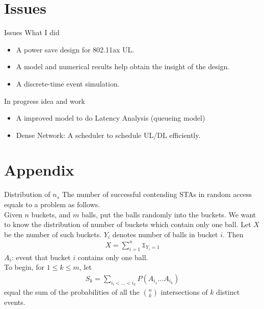 \documentclass[10pt]{beamer}
\begin{document}
\section{Issues}
\begin{frame}{Issues}
	What I did
	\begin{itemize}
		\item
		A power save design for 802.11ax UL. 
		\item 
		A model and numerical results help obtain the insight of the design.
		\item 
		A discrete-time event simulation.
	\end{itemize}
    In progress idea and work
    \begin{itemize}
        \item
        A improved model to do \alert{Latency Analysis} (queueing model)
        \item \alert{Dense Network}: 
        A scheduler to schedule UL/DL efficiently. 
    \end{itemize}
\end{frame}


\section{Appendix}
\begin{frame}{Distribution of $n_s$}
	The number of successful contending STAs in random access equals to a problem as follows. \\
	Given \alert{$n$} buckets, and \alert{$m$} balls, put the balls randomly into the buckets. 
	We want to know the distribution of number of buckets which contain only one ball.
	Let \alert{$X$} be the number of such buckets. \alert{$Y_i$} denotes number of balls in bucket $i$. 
	Then
	\begin{align*}
	X = \sum_{i=1}^n\mathds{1}_{Y_i = 1} 
	\end{align*}
	\alert{$A_i$}: event that bucket $i$ contains only one ball. \\
	To begin, for $1\leq k \leq m$, let
	\begin{align*}
	S_k = \sum_{i_i< \ldots < i_k}P (A_{i_1}\ldots A_{i_k})
	\end{align*}
	equal the sum of the probabilities of all the $\binom{n}{k}$ intersections of $k$ distinct events. 
\end{frame}
\end{document}
